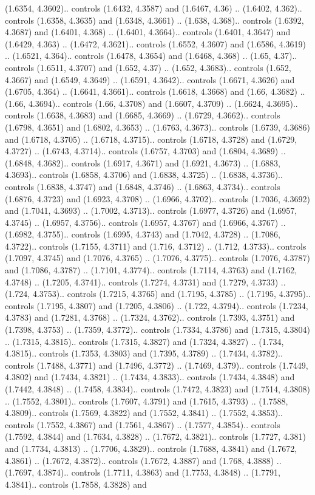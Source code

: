 (1.6354, 4.3602).. controls (1.6432, 4.3587) and (1.6467, 4.36) .. (1.6402, 4.362).. controls (1.6358, 4.3635) and (1.6348, 4.3661) .. (1.638, 4.368).. controls (1.6392, 4.3687) and (1.6401, 4.368) .. (1.6401, 4.3664).. controls (1.6401, 4.3647) and (1.6429, 4.363) .. (1.6472, 4.3621).. controls (1.6552, 4.3607) and (1.6586, 4.3619) .. (1.6521, 4.364).. controls (1.6478, 4.3654) and (1.6468, 4.368) .. (1.65, 4.37).. controls (1.6511, 4.3707) and (1.652, 4.37) .. (1.652, 4.3683).. controls (1.652, 4.3667) and (1.6549, 4.3649) .. (1.6591, 4.3642).. controls (1.6671, 4.3626) and (1.6705, 4.364) .. (1.6641, 4.3661).. controls (1.6618, 4.3668) and (1.66, 4.3682) .. (1.66, 4.3694).. controls (1.66, 4.3708) and (1.6607, 4.3709) .. (1.6624, 4.3695).. controls (1.6638, 4.3683) and (1.6685, 4.3669) .. (1.6729, 4.3662).. controls (1.6798, 4.3651) and (1.6802, 4.3653) .. (1.6763, 4.3673).. controls (1.6739, 4.3686) and (1.6718, 4.3705) .. (1.6718, 4.3715).. controls (1.6718, 4.3728) and (1.6729, 4.3727) .. (1.6743, 4.3714).. controls (1.6757, 4.3703) and (1.6804, 4.3689) .. (1.6848, 4.3682).. controls (1.6917, 4.3671) and (1.6921, 4.3673) .. (1.6883, 4.3693).. controls (1.6858, 4.3706) and (1.6838, 4.3725) .. (1.6838, 4.3736).. controls (1.6838, 4.3747) and (1.6848, 4.3746) .. (1.6863, 4.3734).. controls (1.6876, 4.3723) and (1.6923, 4.3708) .. (1.6966, 4.3702).. controls (1.7036, 4.3692) and (1.7041, 4.3693) .. (1.7002, 4.3713).. controls (1.6977, 4.3726) and (1.6957, 4.3745) .. (1.6957, 4.3756).. controls (1.6957, 4.3767) and (1.6966, 4.3767) .. (1.6982, 4.3755).. controls (1.6995, 4.3743) and (1.7042, 4.3728) .. (1.7086, 4.3722).. controls (1.7155, 4.3711) and (1.716, 4.3712) .. (1.712, 4.3733).. controls (1.7097, 4.3745) and (1.7076, 4.3765) .. (1.7076, 4.3775).. controls (1.7076, 4.3787) and (1.7086, 4.3787) .. (1.7101, 4.3774).. controls (1.7114, 4.3763) and (1.7162, 4.3748) .. (1.7205, 4.3741).. controls (1.7274, 4.3731) and (1.7279, 4.3733) .. (1.724, 4.3753).. controls (1.7215, 4.3765) and (1.7195, 4.3785) .. (1.7195, 4.3795).. controls (1.7195, 4.3807) and (1.7205, 4.3806) .. (1.722, 4.3794).. controls (1.7234, 4.3783) and (1.7281, 4.3768) .. (1.7324, 4.3762).. controls (1.7393, 4.3751) and (1.7398, 4.3753) .. (1.7359, 4.3772).. controls (1.7334, 4.3786) and (1.7315, 4.3804) .. (1.7315, 4.3815).. controls (1.7315, 4.3827) and (1.7324, 4.3827) .. (1.734, 4.3815).. controls (1.7353, 4.3803) and (1.7395, 4.3789) .. (1.7434, 4.3782).. controls (1.7488, 4.3771) and (1.7496, 4.3772) .. (1.7469, 4.379).. controls (1.7449, 4.3802) and (1.7434, 4.3821) .. (1.7434, 4.3833).. controls (1.7434, 4.3848) and (1.7442, 4.3848) .. (1.7458, 4.3834).. controls (1.7472, 4.3823) and (1.7514, 4.3808) .. (1.7552, 4.3801).. controls (1.7607, 4.3791) and (1.7615, 4.3793) .. (1.7588, 4.3809).. controls (1.7569, 4.3822) and (1.7552, 4.3841) .. (1.7552, 4.3853).. controls (1.7552, 4.3867) and (1.7561, 4.3867) .. (1.7577, 4.3854).. controls (1.7592, 4.3844) and (1.7634, 4.3828) .. (1.7672, 4.3821).. controls (1.7727, 4.381) and (1.7734, 4.3813) .. (1.7706, 4.3829).. controls (1.7688, 4.3841) and (1.7672, 4.3861) .. (1.7672, 4.3872).. controls (1.7672, 4.3887) and (1.768, 4.3888) .. (1.7697, 4.3874).. controls (1.7711, 4.3863) and (1.7753, 4.3848) .. (1.7791, 4.3841).. controls (1.7858, 4.3828) and 